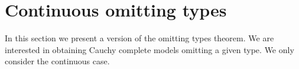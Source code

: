 \documentclass{amsproc}
\begin{document}
{\begin{comment}
  Let $a\models\{\gamma_i(z):i<\omega\}$.
  We claim that that $A,a$ does not p/c-isolate $p(x)$.
  Otherwise, by Fact~\ref{fact_isolation}, $\neg\xi_i(x,a)\rightarrow p(x)$ for some consistent $\neg\xi_i(x,a)$.
  This contradicts $a\models\gamma_{i+1}(z)$.
  
  Therefore the proof is complete if we can show that it is always possible to find the formula $\varphi(x)$ required in (2).
  
  Suppose for a contradiction that $\neg\xi_i(x,z)\wedge\gamma_i(z)$ is consistent while (\#) is inconsistent for all formulas $\varphi(x)\in p$.
  This immediately implies that 
  
  \ceq{\hfill\exists z\;\big[\neg\xi_i(x,z)\wedge\neg\tilde{\gamma}(z)\big]}{\rightarrow}{p(x).}
  
  By Fact~\ref{fact_isolation}, $p(x)$ is p/c-isolated, a contradiction.
\end{proof}

From the lemma we easily obtain an omitting types theorem for positive types that is very close to the classical one.

\begin{theorem}[Positive Omitting Types]\label{thm_pOTT}
  Let ${\EuScript L}^{\rm p}$ be separable.
  Let $A$ be countable.
  Assume also that $p(x)\subseteq{\EuScript L}^{\rm p}(A)$ is not p-isolated.
  Then there is a p-model $M$ containing $A$ that omits $p(x)$. 
\end{theorem}

\begin{proof}
  As in the classical proof, appy the lemma above and the Tarski-Vaught test (Theorem~\ref{thm_Tarski_Vaught}) to obtain a countable p-model $M$ that does not isolate $p(x)$.
  For p-models, p-isolating a type is equivalent to  realizing it.
\end{proof}
\end{comment}

\section{Continuous omitting types}

\def\ceq#1#2#3{\parbox[t]{25ex}{$\displaystyle #1$}\parbox{6ex}{\hfil $#2$}{$\displaystyle #3$}}

In this section we present a version of the omitting types theorem.
We are interested in obtaining Cauchy complete models omitting a given type.
We only consider the continuous case.

}
\end{document}
